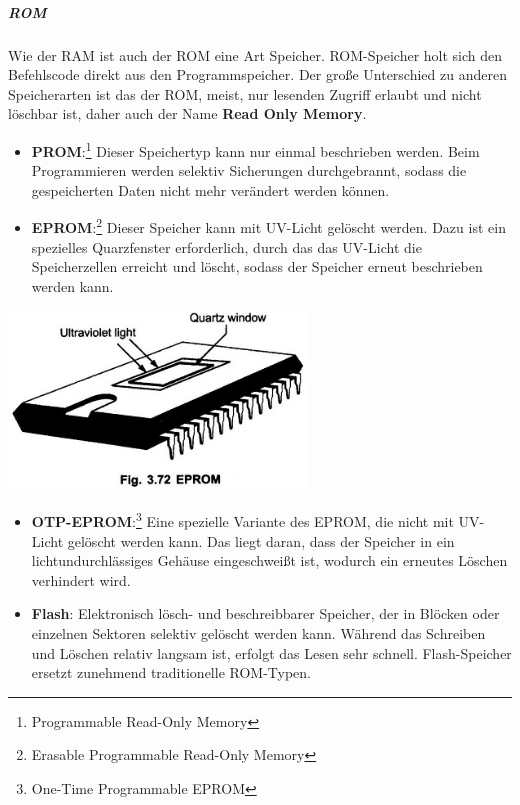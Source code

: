 \documentclass[
    headings=optiontotocandhead,%
    twoside,
    numbers=noenddot,%
    12pt, %
    titlepage, %
    parskip=full, %
    listof=leveldown, 
    numbers=noenddot, %
    a4paper,DIV=14,
    BCOR=15mm,
]{scrbook}
\let\origfigure=\figure
\let\endorigfigure=\endfigure
\renewenvironment{figure}[1][]{%
   \origfigure[H]
}{%
   \endorigfigure
}
\begin{document}
\hypertarget{rom}{%
\subparagraph{ROM}\label{rom}}

Wie der RAM ist auch der ROM eine Art Speicher. ROM-Speicher holt sich
den Befehlscode direkt aus den Programmspeicher. Der große Unterschied
zu anderen Speicherarten ist das der ROM, meist, nur lesenden Zugriff
erlaubt und nicht löschbar ist, daher auch der Name \textbf{Read Only
Memory}.

\begin{itemize}
\item
  \textbf{PROM}:\footnote{Programmable Read-Only Memory} Dieser
  Speichertyp kann nur einmal beschrieben werden. Beim Programmieren
  werden selektiv Sicherungen durchgebrannt, sodass die gespeicherten
  Daten nicht mehr verändert werden können.
\item
  \textbf{EPROM}:\footnote{Erasable Programmable Read-Only Memory}
  Dieser Speicher kann mit UV-Licht gelöscht werden. Dazu ist ein
  spezielles Quarzfenster erforderlich, durch das das UV-Licht die
  Speicherzellen erreicht und löscht, sodass der Speicher erneut
  beschrieben werden kann.
\end{itemize}

\begin{figure}
\centering
\includegraphics[width=3.125in,height=\textheight]{img/Kampl/EPROM.jpg}
\caption{EPROM {[}\protect\hyperlink{ref-EPROM}{7}{]}}
\end{figure}

\begin{itemize}
\item
  \textbf{OTP-EPROM}:\footnote{One-Time Programmable EPROM} Eine
  spezielle Variante des EPROM, die nicht mit UV-Licht gelöscht werden
  kann. Das liegt daran, dass der Speicher in ein lichtundurchlässiges
  Gehäuse eingeschweißt ist, wodurch ein erneutes Löschen verhindert
  wird.
\item
  \textbf{Flash}: Elektronisch lösch- und beschreibbarer Speicher, der
  in Blöcken oder einzelnen Sektoren selektiv gelöscht werden kann.
  Während das Schreiben und Löschen relativ langsam ist, erfolgt das
  Lesen sehr schnell. Flash-Speicher ersetzt zunehmend traditionelle
  ROM-Typen.
\end{itemize}
\end{document}
